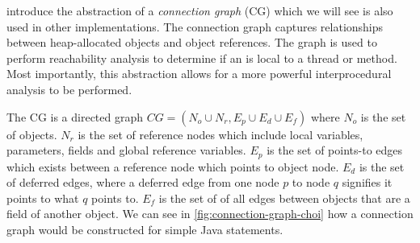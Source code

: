 \documentclass{proposal}
\begin{document}
    \citet{Choi1999} introduce the abstraction of a \emph{connection graph} (CG) which we will see is also used in other implementations.
    The connection graph captures relationships between heap-allocated objects and object references.
    The graph is used to perform reachability analysis to determine if an is local to a thread or method.
    Most importantly, this abstraction allows for a more powerful interprocedural analysis to be performed.

    The CG is a directed graph $CG = (N_{o} \cup N_{r}, E_{p} \cup E_{d} \cup E_{f})$ where $N_{o}$ is the set of objects.
    $N_{r}$ is the set of reference nodes which include local variables, parameters, fields and global reference variables.
    $E_{p}$ is the set of points-to edges which exists between a reference node which points to object node.
    $E_{d}$ is the set of deferred edges, where a deferred edge from one node $p$ to node $q$ signifies it points to what $q$ points to.
    $E_{f}$ is the set of of all edges between objects that are a field of another object.
    We can see in \autoref{fig:connection-graph-choi} how a connection graph would be constructed for simple Java statements.

\end{document}
